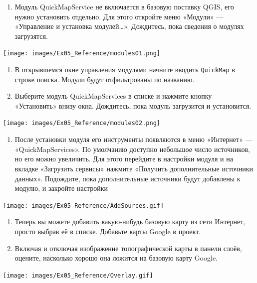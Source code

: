 \documentclass[
  12pt,
]{book}
\providecommand{\tightlist}{%
  \setlength{\itemsep}{0pt}\setlength{\parskip}{0pt}}
\begin{document}
\begin{enumerate}
\def\labelenumi{\arabic{enumi}.}
\tightlist
\item
  Модуль QuickMapService не включается в базовую поставку QGIS, его нужно установить отдельно. Для этого откройте меню «Модули» --- «Управление и установка модулей\ldots». Дождитесь, пока сведения о модулях загрузятся.
\end{enumerate}

\texttt{[image: images/Ex05\_Reference/modules01.png]}

\begin{enumerate}
\def\labelenumi{\arabic{enumi}.}
\setcounter{enumi}{1}
\item
  В открывшемся окне управления модулями начните вводить \texttt{QuickMap} в строке поиска. Модули будут отфильтрованы по названию.
\item
  Выберите модуль QuickMapServices в списке и нажмите кнопку «Установить» внизу окна. Дождитесь, пока модуль загрузится и установится.
\end{enumerate}

\texttt{[image: images/Ex05\_Reference/modules02.png]}

\begin{enumerate}
\def\labelenumi{\arabic{enumi}.}
\setcounter{enumi}{3}
\tightlist
\item
  После установки модуля его инструменты появляются в меню «Интернет» --- «QuickMapServices». По умолчанию доступно небольшое число источников, но его можно увеличить. Для этого перейдите в настройки модуля и на вкладке «Загрузить сервисы» нажмите «Получить дополнительные источники данных». Подождите, пока дополнительные источники будут добавлены к модулю, и закройте настройки
\end{enumerate}

\texttt{[image: images/Ex05\_Reference/AddSources.gif]}

\begin{enumerate}
\def\labelenumi{\arabic{enumi}.}
\setcounter{enumi}{4}
\item
  Теперь вы можете добавить какую-нибудь базовую карту из сети Интернет, просто выбрав её в списке. Добавьте карты Google в проект.
\item
  Включая и отключая изображение топографической карты в панели слоёв, оцените, насколько хорошо она ложится на базовую карту Google.
\end{enumerate}

\texttt{[image: images/Ex05\_Reference/Overlay.gif]}
\end{document}
